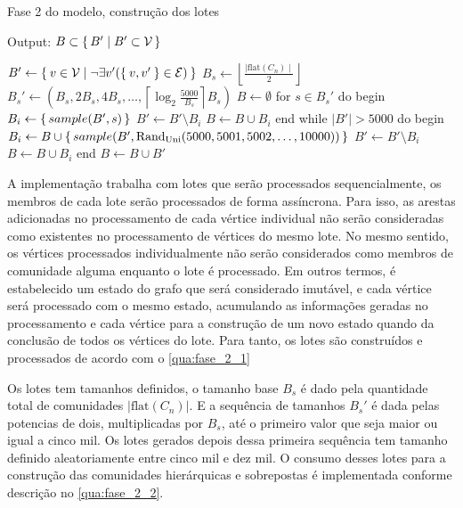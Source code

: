 \documentclass[notes.tex]{subfiles}
\begin{document}
\begin{quadro}[bhtp]
\caption{Fase 2 do modelo, construção dos lotes}
\label{qua:fase_2_1}
\begin{algorithm}
Output: $B \subset \set{B' | B' \subset \operatorname{\mathcal{V}}}$

$B' \leftarrow \Set{v \in \operatorname{\mathcal{V}}| \neg \exists v'(\Set{v, v'} \in \operatorname{\mathcal{E}})}$
$B_s \leftarrow  \left\lfloor  \frac{\mid \text{flat}(C_n) \mid}{2}  \right\rfloor$
$B_s' \leftarrow (B_s, 2B_s, 4B_s, \ldots , \left\lceil \log_2\frac{5000}{B_s} \right\rceil  B_s)$
$B \leftarrow \emptyset$
for $s \in B_s'$ do
begin
    $B_i \leftarrow \set{sample(B', s)}$ 
    $B' \leftarrow B' \setminus B_i$ 
    $B \leftarrow B \cup B_i$ 
end
while $|B'| > 5000$ do
begin
    $B_i \leftarrow B \cup \set{sample(B', \text{Rand}_\text{Uni}({5000, 5001, 5002, \ldots, 10000}))}$
    $B' \leftarrow B' \setminus B_i$ 
    $B \leftarrow B \cup B_i$ 
end
$B \leftarrow B \cup B'$ 
\end{algorithm}
\end{quadro}

A implementação trabalha com lotes que serão processados sequencialmente, os membros de cada lote serão processados de forma assíncrona.
Para isso, as arestas adicionadas no processamento de cada vértice individual não serão consideradas como existentes no processamento de vértices do mesmo lote.
No mesmo sentido, os vértices processados individualmente não serão considerados como membros de comunidade alguma enquanto o lote é processado.
Em outros termos, é estabelecido um estado do grafo que será considerado imutável, e cada vértice será processado com o mesmo estado, acumulando as informações geradas no processamento e cada vértice para a construção de um novo estado quando da conclusão de todos os vértices do lote.
Para tanto, os lotes são construídos e processados de acordo com o \autoref{qua:fase_2_1}

Os lotes tem tamanhos definidos, o tamanho base $B_s$ é dado pela quantidade total de comunidades $|\text{flat}(C_n)|$.
E a sequência de tamanhos $B_s'$ é dada pelas potencias de dois, multiplicadas por $B_s$, até o primeiro valor que seja maior ou igual a cinco mil.
Os lotes gerados depois dessa primeira sequência tem tamanho definido aleatoriamente entre cinco mil e dez mil.
O consumo desses lotes para a construção das comunidades hierárquicas e sobrepostas é implementada conforme descrição no \autoref{qua:fase_2_2}.
\end{document}
